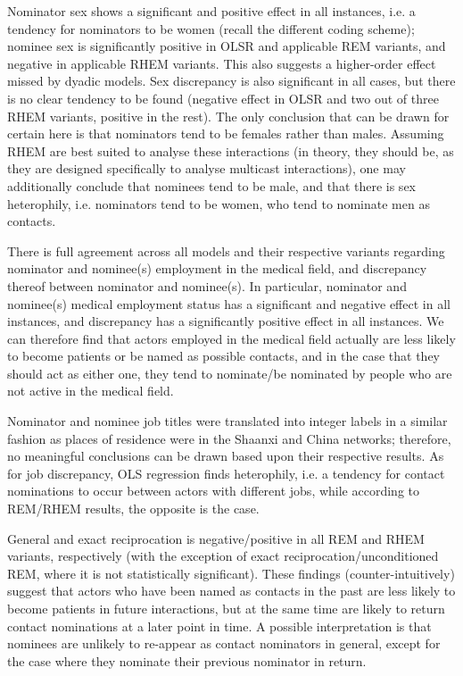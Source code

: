Nominator sex shows a significant and positive effect in all instances, i.e. a tendency for nominators to be women (recall the different coding scheme); nominee sex is significantly positive in OLSR and applicable REM variants, and negative in applicable RHEM variants. This also suggests a higher-order effect missed by dyadic models. Sex discrepancy is also significant in all cases, but there is no clear tendency to be found (negative effect in OLSR and two out of three RHEM variants, positive in the rest). The only conclusion that can be drawn for certain here is that nominators tend to be females rather than males. Assuming RHEM are best suited to analyse these interactions (in theory, they should be, as they are designed specifically to analyse multicast interactions), one may additionally conclude that nominees tend to be male, and that there is sex heterophily, i.e. nominators tend to be women, who tend to nominate men as contacts.

There is full agreement across all models and their respective variants regarding nominator and nominee(s) employment in the medical field, and discrepancy thereof between nominator and nominee(s). In particular, nominator and nominee(s) medical employment status has a significant and negative effect in all instances, and discrepancy has a significantly positive effect in all instances. We can therefore find that actors employed in the medical field actually are less likely to become patients or be named as possible contacts, and in the case that they should act as either one, they tend to nominate/be nominated by people who are not active in the medical field.

Nominator and nominee job titles were translated into integer labels in a similar fashion as places of residence were in the Shaanxi and China networks; therefore, no meaningful conclusions can be drawn based upon their respective results. As for job discrepancy, OLS regression finds heterophily, i.e. a tendency for contact nominations to occur between actors with different jobs, while according to REM/RHEM results, the opposite is the case.

General and exact reciprocation is negative/positive in all REM and RHEM variants, respectively (with the exception of exact reciprocation/unconditioned REM, where it is not statistically significant). These findings (counter-intuitively) suggest that actors who have been named as contacts in the past are less likely to become patients in future interactions, but at the same time are likely to return contact nominations at a later point in time. A possible interpretation is that nominees are unlikely to re-appear as contact nominators in general, except for the case where they nominate their previous nominator in return.

